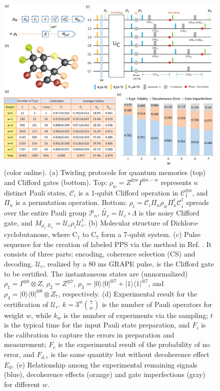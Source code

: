 \documentclass[prl,twocolumn,showpacs,superscriptaddress]{revtex4-1}
\newcommand{\bra}[1]{\langle #1|}
\newcommand{\ket}[1]{|#1\rangle}
\begin{document}
\begin{figure}[htb]
\begin{center}
\includegraphics[width=2\columnwidth]{everything2.eps}
\end{center}
\setlength{\abovecaptionskip}{-0.35cm}
\caption{\footnotesize{(color online). (a) Twirling protocols for quantum memories (top) and Clifford gates (bottom). Top: $\rho_w = Z^{\otimes w}I^{\otimes n-w}$ represents $n$ distinct Pauli states, $\mathcal{C}_i$ is a 1-qubit Clifford operation in $\mathcal{C}_1^{\otimes n}$, and $\Pi_n$ is a permutation operation. Bottom: $\rho_{i} = \mathcal{C}_i \Pi_n \rho_{w} \Pi_n^{\dagger} \mathcal{C}_i^{\dagger}$ spreads over the entire Pauli group $\mathcal{P}_n$, $\tilde{\mathcal{U}_c} = \mathcal{U}_c \circ \Lambda$ is the noisy Clifford gate, and $M_{\rho_i, \mathcal{U}_c} = \mathcal{U}_c \rho_{i} \mathcal{U}_c^{\dagger}$. (b) Molecular structure of Dichloro-cyclobutanone, where C$_1$ to C$_7$ form a 7-qubit system. (c) Pulse sequence for the creation of labeled PPS via the method in Ref. \cite{Knill2000}. It consists of three parts: encoding, coherence selection (CS) and decoding. $\mathcal{U}_{c}$, realized by a 80 ms GRAPE pulse, is the Clifford gate to be certified. The instantaneous states are (unnormalized) $\rho_1 = I^{\otimes 6}\otimes Z$,  $\rho_2 = Z^{\otimes 7}$, $\rho_3 = \ket{0}\bra{0}^{\otimes 7}+\ket{1}\bra{1}^{\otimes 7}$, and $\rho_4 =  \ket{0}\bra{0}^{\otimes 6} \otimes Z_7$, respectively. (d) Experimental result for the certification of $\mathcal{U}_{c}$. $k=3^w\binom{7}{w}$ is the number of Pauli operators for weight $w$, while $k_w$ is the number of experiments via the sampling; $t$ is the typical time for the input Pauli state preparation, and $F_i$ is the calibration to capture the errors in preparation and measurement; $F_e$ is the experimental result of the probability of no error, and $F_{d,c}$ is the same quantity but without decoherence effect $E_d$. (e) Relationship among the experimental remaining signals (blue), decoherence effects (orange) and gate imperfections (gray) for different $w$.}}\label{everything}
\end{figure}
\end{document}
